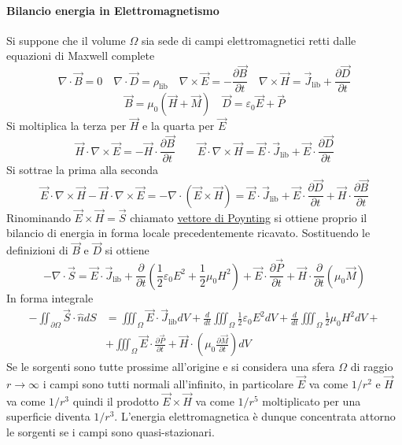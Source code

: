 \paragraph{Bilancio energia in Elettromagnetismo}
Si suppone che il volume $\Omega$ sia sede di campi elettromagnetici retti dalle equazioni di Maxwell complete
$$
\nabla\cdot\vec{B} = 0\quad \nabla\cdot\vec{D} = \rho_\text{lib}\quad \nabla\times\vec{E} = -\frac{\partial\vec{B}}{\partial t}\quad \nabla\times\vec{H} = \vec{J}_\text{lib} + \frac{\partial\vec{D}}{\partial t}
$$
$$
\vec{B} = \mu_0\left(\vec{H}+\vec{M}\right)\quad \vec{D} = \varepsilon_0\vec{E} + \vec{P}
$$
Si moltiplica la terza per $\vec{H}$ e la quarta per $\vec{E}$
$$
\vec{H}\cdot\nabla\times\vec{E} = -\vec{H}\cdot\frac{\partial\vec{B}}{\partial t} \qquad \vec{E}\cdot\nabla\times\vec{H} = \vec{E}\cdot\vec{J}_\text{lib} + \vec{E}\cdot\frac{\partial\vec{D}}{\partial t}
$$
Si sottrae la prima alla seconda
$$
\vec{E}\cdot\nabla\times\vec{H} - \vec{H}\cdot\nabla\times\vec{E} = -\nabla\cdot\left(\vec{E}\times\vec{H}\right)=
\vec{E}\cdot\vec{J}_\text{lib} + \vec{E}\cdot\frac{\partial\vec{D}}{\partial t} + \vec{H}\cdot\frac{\partial\vec{B}}{\partial t}
$$
Rinominando $\vec{E}\times\vec{H} = \vec{S}$ chiamato \href{https://it.wikipedia.org/wiki/Teorema_di_Poynting}{vettore di Poynting} si ottiene proprio il bilancio di energia
in forma locale precedentemente ricavato. Sostituendo le definizioni di $\vec{B}$ e $\vec{D}$ si ottiene
$$
-\nabla\cdot\vec{S} = \vec{E}\cdot\vec{J}_\text{lib} + \frac{\partial}{\partial t}\left(\frac{1}{2}\varepsilon_0E^2 + \frac{1}{2}\mu_0H^2\right) + \vec{E}\cdot\frac{\partial\vec{P}}{\partial t} + \vec{H}\cdot\frac{\partial}{\partial t} \left(\mu_0 \vec{M}\right)
$$
In forma integrale
$$\begin{aligned}
-\iint_{\partial\Omega}\vec{S}\cdot\hat{n}dS &= \iiint_\Omega\vec{E}\cdot \vec{J}_\text{lib}dV + \frac{d}{dt}\iiint_\Omega \frac{1}{2}\varepsilon_0E^2dV + \frac{d}{dt}\iiint_\Omega \frac{1}{2}\mu_0H^2dV +\\ 
&+ \iiint_\Omega\vec{E}\cdot\frac{\partial \vec{P}}{\partial t} + \vec{H}\cdot\left(\mu_0\frac{\partial\vec{M}}{\partial t}\right)dV
\end{aligned}
$$
Se le sorgenti sono tutte prossime all'origine e si considera una sfera $\Omega$ di raggio $r\to\infty$ i campi
sono tutti normali all'infinito, in particolare $\vec{E}$ va come $1/r^2$ e $\vec{H}$ va come
$1/r^3$ quindi il prodotto $\vec{E}\times\vec{H}$ va come $1/r^5$ moltiplicato per una superficie
diventa $1/r^3$. L'energia elettromagnetica è dunque concentrata attorno le sorgenti se i campi sono
quasi-stazionari.

